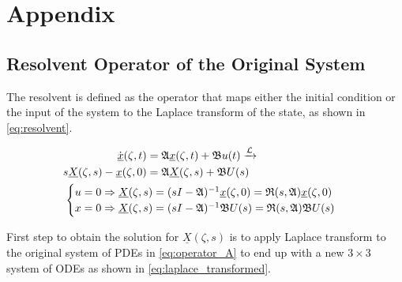 \section*{Appendix}

\subsection{Resolvent Operator of the Original System}

The resolvent is defined as the operator that maps either the initial condition or the input of the system to the Laplace transform of the state, as shown in \eqref{eq:resolvent}.

\begin{equation} \label{eq:resolvent}
\begin{aligned}
    \dot{\underline{x}}(\zeta, t) &= \mathfrak{A} \underline{x}(\zeta, t) + \mathfrak{B} u(t) \xrightarrow{\mathcal{L}}\\
    s \underline{X}(\zeta,s) - \underline{x}(\zeta,0) &= \mathfrak{A} \underline{X}(\zeta,s) + \mathfrak{B} U(s)\\
    &\hspace{-7.5em}\begin{cases}
        u = 0 \Rightarrow \underline{X}(\zeta,s) = (sI - \mathfrak{A})^{-1} \underline{x}(\zeta,0) = \mathfrak{R}(s, \mathfrak{A}) \underline{x}(\zeta,0)\\
        x = 0 \Rightarrow \underline{X}(\zeta,s) = (sI - \mathfrak{A})^{-1} \mathfrak{B} U(s) = \mathfrak{R}(s, \mathfrak{A}) \mathfrak{B} U(s)
    \end{cases}
\end{aligned}
\end{equation}

First step to obtain the solution for $\underline{X}(\zeta, s)$ is to apply Laplace transform to the original system of PDEs in \eqref{eq:operator_A} to end up with a new $3 \times 3$ system of ODEs as shown in \eqref{eq:laplace_transformed}.

